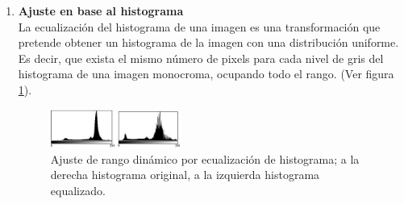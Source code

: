\begin{enumerate}
		\item \textbf{Ajuste en base al histograma}\\
			La ecualización del histograma de una imagen es una transformación que pretende obtener un histograma de la imagen con una distribución uniforme. Es decir, que exista el mismo número de pixels para cada nivel de gris del histograma de una imagen monocroma, ocupando todo el rango. (Ver figura \ref{fig:HDRHistograma}).
			\begin{figure}[!htb]
				\centering
				\includegraphics[width=0.4\textwidth]{images/histEqualizado.jpg}
				\caption{\label{fig:HDRHistograma}{\small Ajuste de rango dinámico por ecualización de histograma; a la derecha histograma original, a la izquierda histograma equalizado.}}
			\end{figure}
	\end{enumerate}


